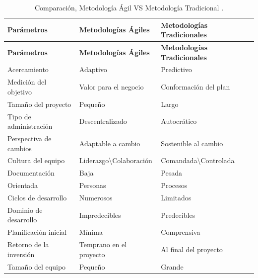     
\begin{longtable}{|p{4cm}|p{4cm}|p{4cm}|}
	\caption[Comparación, Metodología Ágil VS Metodología Tradicional.]{Comparación, Metodología Ágil VS Metodología Tradicional \citep{awad2005agile_v_traditional}.} 
    \label{tab:metodologias} \\
    
    \hline
    \rowcolor[HTML]{CBCEFB} 
    \textbf{Parámetros} & \textbf{Metodologías Ágiles} & \textbf{Metodologías Tradicionales} \\
    \hline
    \endfirsthead
    	
    \hline
    \rowcolor[HTML]{CBCEFB} 
    \textbf{Parámetros} & \textbf{Metodologías Ágiles} & \textbf{Metodologías Tradicionales} \\
    \hline
    \endhead
    	
    Acercamiento & Adaptivo & Predictivo \\ 
    \hline
    \rowcolor[HTML]{EDEBF1}
    Medición del objetivo & Valor para el negocio & Conformación del plan \\ 
    \hline
    Tamaño del proyecto & Pequeño & Largo \\ 
    \hline
    \rowcolor[HTML]{EDEBF1}
    Tipo de administración & Descentralizado & Autocrático \\ 
    \hline
    Perspectiva de cambios & Adaptable a cambio & Sostenible al cambio \\ 
    \hline
    \rowcolor[HTML]{EDEBF1}
    Cultura del equipo & Liderazgo\textbackslash Colaboración & Comandada\textbackslash Controlada \\ 
    \hline
    Documentación & Baja & Pesada \\ 
    \hline
    \rowcolor[HTML]{EDEBF1}
    Orientada & Personas & Procesos \\ 
    \hline
    Ciclos de desarrollo & Numerosos & Limitados \\ 
    \hline
    \rowcolor[HTML]{EDEBF1}
    Dominio de desarrollo & Impredecibles & Predecibles \\ 
    \hline
    Planificación inicial & Mínima & Comprensiva \\ 
    \hline
    \rowcolor[HTML]{EDEBF1}
    Retorno de la inversión & Temprano en el proyecto & Al final del proyecto \\ 
    \hline
    Tamaño del equipo & Pequeño & Grande \\ 
    \hline
    
\end{longtable}
    

